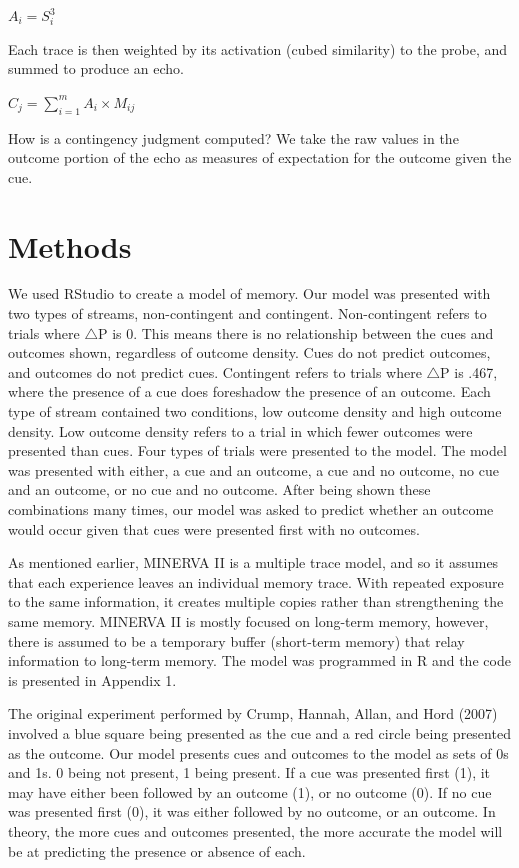 \documentclass[
  english,
  man,floatsintext]{apa6}
\begin{document}
\(A_i = S_i^3\)

Each trace is then weighted by its activation (cubed similarity) to the probe, and summed to produce an echo.

\(C_j = \sum_{i=1}^m A_i \times M_{ij}\)

How is a contingency judgment computed? We take the raw values in the outcome portion of the echo as measures of expectation for the outcome given the cue.

\hypertarget{methods}{%
\section{Methods}\label{methods}}

We used RStudio to create a model of memory. Our model was presented with two types of streams, non-contingent and contingent. Non-contingent refers to trials where \(\triangle\)P is 0. This means there is no relationship between the cues and outcomes shown, regardless of outcome density. Cues do not predict outcomes, and outcomes do not predict cues. Contingent refers to trials where \(\triangle\)P is .467, where the presence of a cue does foreshadow the presence of an outcome. Each type of stream contained two conditions, low outcome density and high outcome density. Low outcome density refers to a trial in which fewer outcomes were presented than cues. Four types of trials were presented to the model. The model was presented with either, a cue and an outcome, a cue and no outcome, no cue and an outcome, or no cue and no outcome. After being shown these combinations many times, our model was asked to predict whether an outcome would occur given that cues were presented first with no outcomes.

As mentioned earlier, MINERVA II is a multiple trace model, and so it assumes that each experience leaves an individual memory trace. With repeated exposure to the same information, it creates multiple copies rather than strengthening the same memory. MINERVA II is mostly focused on long-term memory, however, there is assumed to be a temporary buffer (short-term memory) that relay information to long-term memory. The model was programmed in R and the code is presented in Appendix 1.

The original experiment performed by Crump, Hannah, Allan, and Hord (2007) involved a blue square being presented as the cue and a red circle being presented as the outcome. Our model presents cues and outcomes to the model as sets of 0s and 1s. 0 being not present, 1 being present. If a cue was presented first (1), it may have either been followed by an outcome (1), or no outcome (0). If no cue was presented first (0), it was either followed by no outcome, or an outcome. In theory, the more cues and outcomes presented, the more accurate the model will be at predicting the presence or absence of each.
\end{document}
